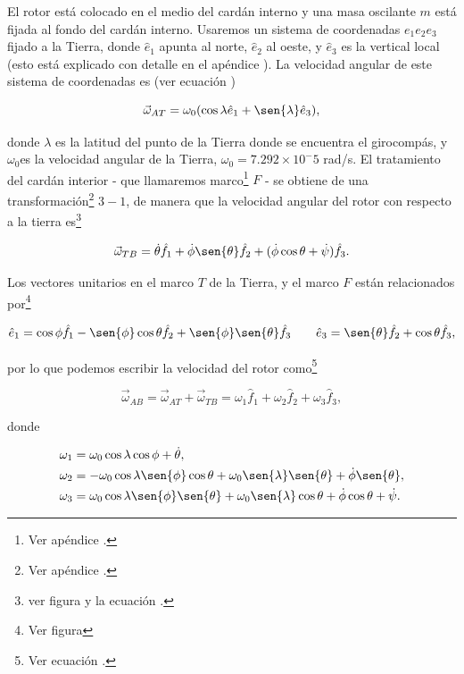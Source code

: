 \documentclass[a4paper,10pt]{article}
\numberwithin{equation}{section}
\begin{document}
El rotor está colocado en el medio del cardán interno y una masa oscilante $m$ está 
fijada al fondo del cardán interno. Usaremos un sistema de coordenadas $e_1e_2e_3$
fijado a la Tierra, donde $\hat{e}_1$ apunta al norte, $\hat{e}_2$ al oeste, y $\hat{e}_3$
es la vertical local (esto está explicado con detalle en el apéndice ). 
La velocidad angular de este sistema de coordenadas es (ver ecuación ) 

\begin{equation}
 \vec{\omega}_{AT} = \omega_0(\cos{\lambda}\hat{e}_1 + \sen{\lambda}\hat{e}_3),
\end{equation}

donde $\lambda$ es la latitud del punto de la Tierra donde se encuentra el girocompás, y 
$\omega_0$es la velocidad angular de la Tierra, $\omega_0 = 7.292\times 10^-5$ rad/s. 
El tratamiento del cardán interior - que llamaremos marco\footnote{Ver apéndice 
.} $F$ - se obtiene de una transformación\footnote{Ver apéndice 
.} $3-1$, de manera que la velocidad angular del rotor con respecto 
a la tierra es\footnote{ver figura  y la ecuación .}

\begin{equation}
 \vec{\omega}_{TB} = \dot{\theta}\hat{f}_1 + \dot{\phi}\sen{\theta}\hat{f}_2 + 
 (\dot{\phi}\cos{\theta} + \dot{\psi})\hat{f}_3.
\end{equation}

Los vectores unitarios en el marco $T$ de la Tierra, y el marco $F$ están relacionados 
por\footnote{Ver figura }

\begin{equation}
 \hat{e}_1 = \cos{\phi}\hat{f}_1 - \sen{\phi}\cos{\theta}\hat{f}_2 + \sen{\phi}\sen{\theta}\hat{f}_3 
 \qquad \hat{e}_3 = \sen{\theta}\hat{f}_2 + \cos{\theta}\hat{f}_3,
\end{equation}

por lo que podemos escribir la velocidad del rotor como\footnote{Ver ecuación 
.}

\begin{equation}
 \vec{\omega}_{AB} = \vec{\omega}_{AT} + \vec{\omega}_{TB} = \omega_1\hat{f}_1 
 + \omega_2\hat{f}_2 + \omega_3\hat{f}_3,
\end{equation}

donde 

\begin{align}
 \omega_1 &= \omega_0\cos{\lambda}\cos{\phi} + \dot{\theta}, \\
 \omega_2 &= - \omega_0\cos{\lambda}\sen{\phi}\cos{\theta} + \omega_0\sen{\lambda}\sen{\theta} + 
 \dot{\phi}\sen{\theta}, \\
 \omega_3 &= \omega_0\cos{\lambda}\sen{\phi}\sen{\theta} + \omega_0\sen{\lambda}\cos{\theta} 
 + \dot{\phi}\cos{\theta} + \dot{\psi}.
\end{align}
\end{document}
